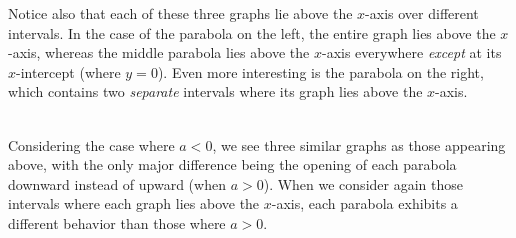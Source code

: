 \documentclass[12pt]{article}
\theoremstyle{definition}
\begin{document}
Notice also that each of these three graphs lie above the $x$-axis over different intervals.  In the case of the parabola on the left, the entire graph lies above the $x$-axis, whereas the middle parabola lies above the $x$-axis everywhere {\it except} at its $x$-intercept (where $y=0$).  Even more interesting is the parabola on the right, which contains two {\it separate} intervals where its graph lies above the $x$-axis.\\
\ \par
Considering the case where $a<0$, we see three similar graphs as those appearing above, with the only major difference being the opening of each parabola downward instead of upward (when $a>0$).  When we consider again those intervals where each graph lies above the $x$-axis, each parabola exhibits a different behavior than those where $a>0$. 

\begin{center}
\end{center}
\end{document}
